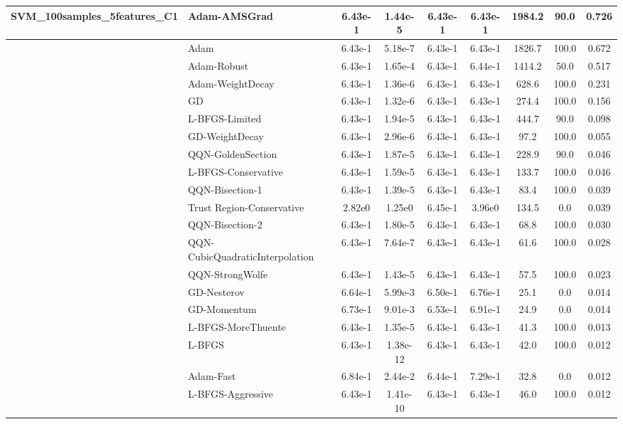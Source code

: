 \documentclass{article}
\begin{document}
\begin{longtable}{|l|l|c|c|c|c|c|c|c|}
SVM\_100samples\_5features\_C1 & \textbf{Adam-AMSGrad} & 6.43e-1 & 1.44e-5 & 6.43e-1 & 6.43e-1 & 1984.2 & 90.0 & 0.726 \\
\hline
 & Adam & 6.43e-1 & 5.18e-7 & 6.43e-1 & 6.43e-1 & 1826.7 & 100.0 & 0.672 \\
\hline
 & Adam-Robust & 6.43e-1 & 1.65e-4 & 6.43e-1 & 6.44e-1 & 1414.2 & 50.0 & 0.517 \\
\hline
 & Adam-WeightDecay & 6.43e-1 & 1.36e-6 & 6.43e-1 & 6.43e-1 & 628.6 & 100.0 & 0.231 \\
\hline
 & GD & 6.43e-1 & 1.32e-6 & 6.43e-1 & 6.43e-1 & 274.4 & 100.0 & 0.156 \\
\hline
 & L-BFGS-Limited & 6.43e-1 & 1.94e-5 & 6.43e-1 & 6.43e-1 & 444.7 & 90.0 & 0.098 \\
\hline
 & GD-WeightDecay & 6.43e-1 & 2.96e-6 & 6.43e-1 & 6.43e-1 & 97.2 & 100.0 & 0.055 \\
\hline
 & QQN-GoldenSection & 6.43e-1 & 1.87e-5 & 6.43e-1 & 6.43e-1 & 228.9 & 90.0 & 0.046 \\
\hline
 & L-BFGS-Conservative & 6.43e-1 & 1.59e-5 & 6.43e-1 & 6.43e-1 & 133.7 & 100.0 & 0.046 \\
\hline
 & QQN-Bisection-1 & 6.43e-1 & 1.39e-5 & 6.43e-1 & 6.43e-1 & 83.4 & 100.0 & 0.039 \\
\hline
 & Trust Region-Conservative & 2.82e0 & 1.25e0 & 6.45e-1 & 3.96e0 & 134.5 & 0.0 & 0.039 \\
\hline
 & QQN-Bisection-2 & 6.43e-1 & 1.80e-5 & 6.43e-1 & 6.43e-1 & 68.8 & 100.0 & 0.030 \\
\hline
 & QQN-CubicQuadraticInterpolation & 6.43e-1 & 7.64e-7 & 6.43e-1 & 6.43e-1 & 61.6 & 100.0 & 0.028 \\
\hline
 & QQN-StrongWolfe & 6.43e-1 & 1.43e-5 & 6.43e-1 & 6.43e-1 & 57.5 & 100.0 & 0.023 \\
\hline
 & GD-Nesterov & 6.64e-1 & 5.99e-3 & 6.50e-1 & 6.76e-1 & 25.1 & 0.0 & 0.014 \\
\hline
 & GD-Momentum & 6.73e-1 & 9.01e-3 & 6.53e-1 & 6.91e-1 & 24.9 & 0.0 & 0.014 \\
\hline
 & L-BFGS-MoreThuente & 6.43e-1 & 1.35e-5 & 6.43e-1 & 6.43e-1 & 41.3 & 100.0 & 0.013 \\
\hline
 & L-BFGS & 6.43e-1 & 1.38e-12 & 6.43e-1 & 6.43e-1 & 42.0 & 100.0 & 0.012 \\
\hline
 & Adam-Fast & 6.84e-1 & 2.44e-2 & 6.44e-1 & 7.29e-1 & 32.8 & 0.0 & 0.012 \\
\hline
 & L-BFGS-Aggressive & 6.43e-1 & 1.41e-10 & 6.43e-1 & 6.43e-1 & 46.0 & 100.0 & 0.012 \\

\end{longtable}
\end{document}
